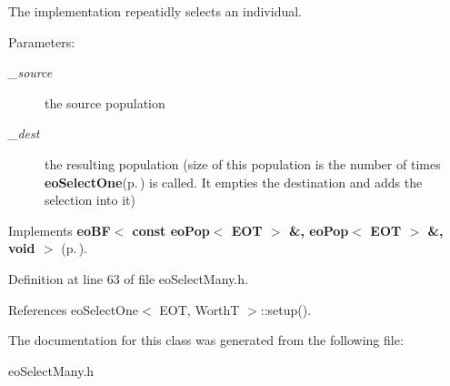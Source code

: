 The implementation repeatidly selects an individual. 

\begin{Desc}
\item[Parameters:]
\begin{description}
\item[{\em \_\-source}]the source population \item[{\em \_\-dest}]the resulting population (size of this population is the number of times {\bf eo\-Select\-One}{\rm (p.\,\pageref{classeo_select_one})} is called. It empties the destination and adds the selection into it) \end{description}
\end{Desc}


Implements {\bf eo\-BF$<$ const eo\-Pop$<$ EOT $>$ \&, eo\-Pop$<$ EOT $>$ \&, void $>$} {\rm (p.\,\pageref{classeo_b_f_a1})}.

Definition at line 63 of file eo\-Select\-Many.h.

References eo\-Select\-One$<$ EOT, Worth\-T $>$::setup().

The documentation for this class was generated from the following file:\begin{CompactItemize}
\item 
eo\-Select\-Many.h\end{CompactItemize}
